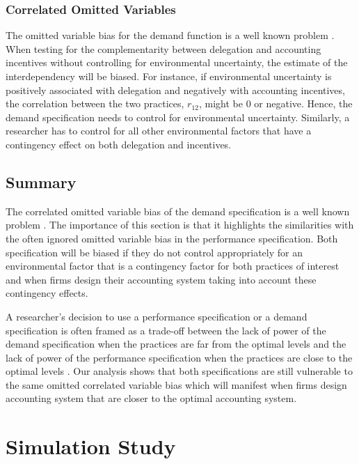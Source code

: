 \documentclass[12pt]{article}
\begin{document}
\subsubsection{Correlated Omitted Variables}

The omitted variable bias for the demand function is a well known problem \citep{Arora1996,grabner_management_2013,Hofmann2015OrganizationalChoices}. When testing for the complementarity between delegation and accounting incentives without controlling for environmental uncertainty, the estimate of the interdependency will be biased. For instance, if environmental uncertainty is positively associated with delegation and negatively with accounting incentives, the correlation between the two practices, $r_{12}$, might be $0$ or negative. Hence, the demand specification needs to control for environmental uncertainty. Similarly, a researcher has to control for all other environmental factors that have a contingency effect on both delegation and incentives.

\subsection{Summary}

The correlated omitted variable bias of the demand specification is a well known problem \citep{Grabner2013,Arora1996,Carree2011}. The importance of this section is that it highlights the similarities with the often ignored omitted variable bias in the performance specification. Both specification will be biased if they do not control appropriately for an environmental factor that is a contingency factor for  both practices of interest and when firms design their accounting system taking into account these contingency effects.

A researcher's decision to use a performance specification or a demand specification is often framed as a trade-off between the lack of power of the demand specification when the practices are far from the optimal levels and the lack of power of the performance specification when the practices are close to the optimal levels \citep{Grabner2013,Aral2012,Johansson2018}. Our analysis shows that both specifications are still vulnerable to the same omitted correlated variable bias which will manifest when firms design accounting system that are closer to the optimal accounting system.



\section{Simulation Study}\label{simulation-study}
\end{document}
